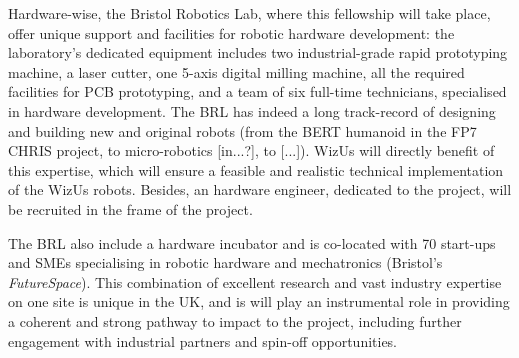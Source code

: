 \documentclass[11pt,a4paper]{report}
\newcommand{\project}{WizUs\xspace}
\begin{document}
Hardware-wise, the Bristol Robotics Lab, where this fellowship will take place,
offer unique support and facilities for robotic hardware development: the
laboratory's dedicated equipment includes two industrial-grade rapid prototyping
machine, a laser cutter, one 5-axis digital milling machine, all the required
facilities for PCB prototyping, and a team of six full-time technicians,
specialised in hardware development. The BRL has indeed a long track-record of
designing and building new and original robots (from the BERT humanoid in the
FP7 CHRIS project, to micro-robotics [in...?], to [...]). \project will directly
benefit of this expertise, which will ensure a feasible and realistic technical
implementation of the \project robots. Besides, an hardware engineer, dedicated
to the project, will be recruited in the frame of the project.

The BRL also include a hardware incubator and is co-located with 70 start-ups
and SMEs specialising in robotic hardware and mechatronics (Bristol's
\emph{FutureSpace}). This combination of excellent research and vast industry
expertise on one site is unique in the UK, and is will play an instrumental role
in providing a coherent and strong pathway to impact to the project, including
further engagement with industrial partners and spin-off opportunities.


\printbibliography
\end{document}
